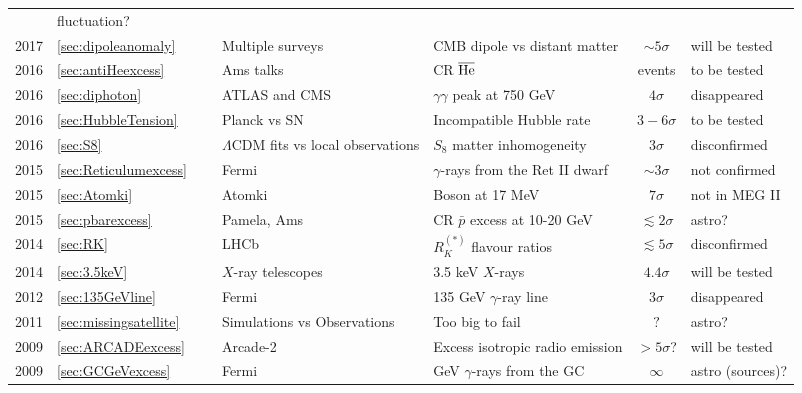 \begin{table}[p]
\begin{tabular}{lllllcl}
& fluctuation?\\
%
\rowcolor{green!10} 2017 & \ref{sec:dipoleanomaly}&\cite{dipoleanomaly} & Multiple surveys & CMB dipole vs distant matter & $\sim5\sigma$ 
& will be tested\\
%
\rowcolor{green!5} 2016 & \ref{sec:antiHeexcess}&\cite{Antihelium} & {\sc Ams} talks& CR $\overline{\rm He}$ & events 
& to be tested\\
%
\rowcolor{red!50} 2016 & \ref{sec:diphoton}&\cite{diphoton} & ATLAS and CMS & $\gamma\gamma$ peak at 750 GeV & $ 4\sigma$ & disappeared\\
%
\rowcolor{green!15} 2016 & \ref{sec:HubbleTension}&\cite{H0tension} & {\sc Planck} vs SN & Incompatible Hubble rate  & $3-6\sigma$ 
& to be tested\\
%
\rowcolor{red!50} 2016 & \ref{sec:S8}&\cite{S8anomaly} & $\Lambda$CDM fits vs local observations& $S_8$ matter inhomogeneity  & $3\sigma$ 
& disconfirmed\\
%
\rowcolor{red!30} 2015 & \ref{sec:Reticulumexcess}&\cite{Reticulumexcess} & {\sc Fermi} & $\gamma$-rays from the Ret II dwarf & $\sim3\sigma$ 
& not confirmed\\
%
\rowcolor{yellow!10} 2015 & \ref{sec:Atomki}&\cite{Atomki} & {\sc Atomki} & Boson at 17 MeV  & $7\sigma$  & not in MEG II\\
%
\rowcolor{orange!20} 2015 & \ref{sec:pbarexcess}&\cite{pbarexcess} & {\sc Pamela}, {\sc Ams} & CR $\bar p$ excess at 10-20 GeV & $\lesssim 2 \sigma$ 
& astro?\\
%
\rowcolor{red!50} 2014 & \ref{sec:RK}&\cite{RKanomaly} & LHCb & $R^{(*)}_K$ flavour ratios & $\lesssim 5\sigma$
& disconfirmed\\
%
\rowcolor{green!10} 2014 &\ref{sec:3.5keV}&\cite{3.5KeV} & $X$-ray telescopes & 3.5 keV $X$-rays & $4.4\sigma$ 
& will be tested\\
%
\rowcolor{red!50}2012 &\ref{sec:135GeVline}&\cite{135GeVline} & {\sc Fermi} & 135 GeV  $\gamma$-ray line & $3\sigma$ 
&disappeared\\
%
\rowcolor{red!20}2011 & \ref{sec:missingsatellite} &~\cite{toobigtofail} & Simulations vs Observations & Too big to fail & $?$ 
& astro?\\
%
\rowcolor{green!5} 2009 & \ref{sec:ARCADEexcess}&\cite{ARCADE2} & {\sc Arcade-2} & Excess isotropic radio emission & $>5\sigma$? 
& will be tested \\
%
\rowcolor{green!5} 2009 & \ref{sec:GCGeVexcess}&\cite{GeVGCexcess} & {\sc Fermi} & GeV $\gamma$-rays from the GC& $\infty$ 
& astro (sources)?\\

\end{tabular}
\end{table}
